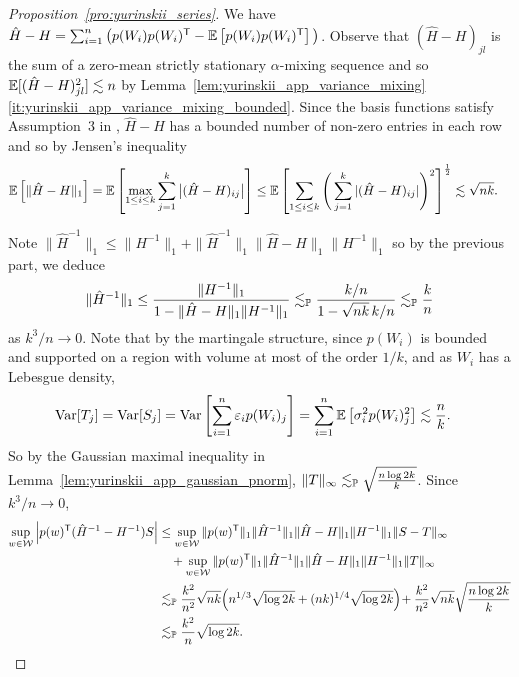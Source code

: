 \begin{proof}[Proposition~\ref{pro:yurinskii_series}]

  We have
  $\hat H - H = \sum_{i=1}^n \big(p(W_i)p(W_i)^\T - \E\left[
  p(W_i)p(W_i)^\T \right]\big)$.
  Observe that $(\hat H - H)_{j l}$ is the sum of
  a zero-mean strictly stationary $\alpha$-mixing sequence and so
  $\E[(\hat H - H)_{j l}^2] \lesssim n$ by
  Lemma~\ref{lem:yurinskii_app_variance_mixing}%
  \ref{it:yurinskii_app_variance_mixing_bounded}.
  Since the basis
  functions satisfy Assumption~3 in \citet{cattaneo2020large},
  $\hat H-H$ has a
  bounded number of non-zero entries in each row and so by Jensen's inequality
  \begin{align*}
    \E\left[
      \|\hat H-H\|_1
    \right]
    &=
    \E\left[
      \max_{1 \leq i \leq k}
      \sum_{j=1}^k
      \big|(\hat H-H)_{i j}\big|
    \right]
    \leq
    \E\left[
      \sum_{1 \leq i \leq k}
      \Bigg(
        \sum_{j=1}^k
        |(\hat H-H)_{i j}|
      \Bigg)^2
    \right]^{\frac{1}{2}}
    \lesssim \sqrt{n k}.
  \end{align*}


  Note $\|\hat H^{-1}\|_1 \leq \|H^{-1}\|_1
  + \|\hat H^{-1}\|_1 \|\hat H-H\|_1 \|H^{-1}\|_1$
  so by the previous part, we deduce
  \begin{align*}
    \|\hat H^{-1}\|_1
    \leq
    \frac{\|H^{-1}\|_1}
    {1 - \|\hat H-H\|_1 \|H^{-1}\|_1}
    \lesssim_\P
    \frac{k/n}
    {1 - \sqrt{n k}\, k/n}
    \lesssim_\P
    \frac{k}{n}
  \end{align*}
  as $k^3 / n \to 0$. Note that by the martingale structure, since
  $p(W_i)$ is bounded and supported on a region with volume at most of the order
  $1/k$, and as $W_i$ has a Lebesgue density,
  \begin{align*}
    \Var[T_j]
    &=
    \Var[S_j]
    =
    \Var\left[
      \sum_{i=1}^n \varepsilon_i p(W_i)_j
    \right]
    =
    \sum_{i=1}^n
    \E\left[
      \sigma_i^2 p(W_i)_j^2
    \right]
    \lesssim
    \frac{n}{k}.
  \end{align*}
  So by the Gaussian maximal inequality in
  Lemma~\ref{lem:yurinskii_app_gaussian_pnorm},
  $\|T\|_\infty \lesssim_\P \sqrt{\frac{n \log 2k}{k}}$.
  Since $k^3/n \to 0$,
  \begin{align*}
    \sup_{w \in \cW}
    \left|
    p(w)^\T (\hat H^{-1} - H^{-1}) S
    \right|
    &\leq
    \sup_{w \in \cW}
    \|p(w)^\T\|_1
    \|\hat H^{-1}\|_1
    \|\hat H - H\|_1
    \|H^{-1}\|_1
    \|S - T\|_\infty \\
    &\quad+
    \sup_{w \in \cW}
    \|p(w)^\T\|_1
    \|\hat H^{-1}\|_1
    \|\hat H - H\|_1
    \|H^{-1}\|_1
    \|T\|_\infty \\
    &\lesssim_\P
    \frac{k^2}{n^2}
    \sqrt{n k}
    \!\left(
      n^{1/3} \sqrt{\log 2k}
      + (n k)^{1/4} \sqrt{\log 2k}
    \right)
    \!+ \frac{k^2}{n^2}
    \sqrt{n k}
    \sqrt{\frac{n \log 2k}{k}} \\
    &\lesssim_\P
    \frac{k^2}{n}
    \sqrt{\log 2k}.
  \end{align*}


\end{proof}
